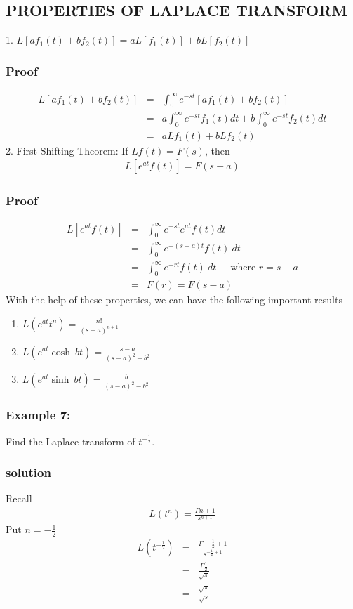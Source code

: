 \documentclass[12pt]{report}
\begin{document}
\subsection{PROPERTIES OF LAPLACE TRANSFORM}
1. $L[af_1(t)+bf_2(t)]=aL[f_1(t)]+bL[f_2(t)]$
\subsubsection{Proof}
\begin{eqnarray}
L[af_1(t)+bf_2(t)]&= &\int_0^\infty e^{-st}[af_1(t)+bf_2(t)]\nonumber \\
& = &a \int_0^\infty e^{-st}f_1(t)dt + b\int_0^\infty e^{-st}f_2(t)dt\nonumber \\
& =& aLf_1(t)+bLf_2(t)
\end{eqnarray}
2. First Shifting Theorem: If $Lf(t)=F(s)$, then
\begin{align*}
L[e^{at}f(t)]=F(s-a)
\end{align*}
\subsubsection{Proof}
\begin{eqnarray}
L[e^{at}f(t)]&=& \int_0^\infty e^{-st} e^{at}f(t)dt\nonumber \\
&=&\int_0^\infty e^{-(s-a)t}f(t)~dt \nonumber\\
&=& \int_0^\infty e^{-rt}f(t)~dt ~~~~~\mbox{ where } r=s-a \nonumber\\
&=& F(r)=F(s-a)
\end{eqnarray}
With the help of these properties, we can have the following important results
\begin{enumerate}
	\item $L(e^{at}t^n)=\frac{n!}{(s-a)^{n+1}}$
  \item $L(e^{at} \cosh~bt)=\frac{s-a}{(s-a)^2-b^2}$
  \item $L(e^{at}\sinh~bt)=\frac{b}{(s-a)^2-b^2}$
\end{enumerate}
\subsubsection{Example 7:} 
Find the Laplace transform of $t^{-\frac{1}{2}}$.
\subsubsection{solution}
Recall
\begin{align*}
L(t^n)=\frac{\Gamma n+1}{s^{n+1}}
\end{align*}
Put $n=-\frac{1}{2}$
\begin{eqnarray}
L(t^{-\frac{1}{2}})&=&\frac{\Gamma -\frac{1}{2}+1}{s^{-\frac{1}{2}+1}} \nonumber\\
&=&\frac{\Gamma \frac{1}{2}}{\sqrt{s}} \nonumber\\
&=& \frac{\sqrt{\pi}}{\sqrt{s}}
\end{eqnarray}
\end{document}
